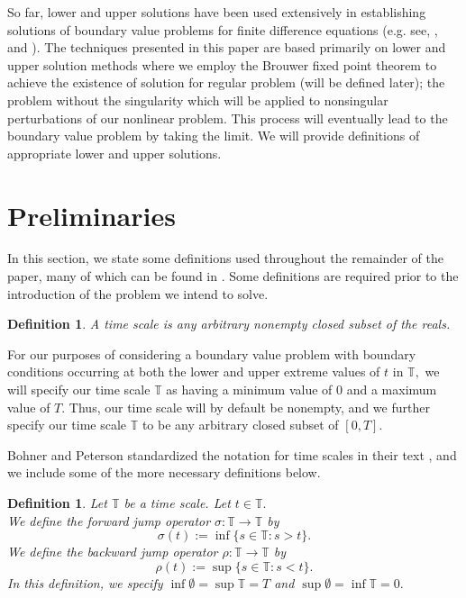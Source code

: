 \documentclass[12pt,reqno]{amsart}
\newtheorem{definition}[theorem]{Definition}
\begin{document}
So far, lower and upper solutions have been used extensively in establishing solutions of boundary value problems for finite difference equations (e.g. see\cite{bao2012}, \cite{henderson2006}, and \cite{precup2016}). The techniques presented in this paper are based primarily on lower and upper solution methods where we employ the Brouwer fixed point theorem \cite{zeidler1986} to achieve the existence of solution for regular problem (will be defined later); the problem without the singularity which will be applied to nonsingular perturbations of our nonlinear problem. This process will eventually lead to the boundary value problem by taking the limit. We will provide definitions of appropriate lower and upper solutions.








\section{Preliminaries}

In this section, we state some definitions used throughout the remainder of the paper, many of which can be found in \cite{bohner2001}.  Some definitions are required prior to the introduction of the problem we intend to solve.

\begin{definition}\label{timescale}
	A time scale is any arbitrary nonempty closed subset of the reals.
\end{definition}

For our purposes of considering a boundary value problem with boundary conditions occurring at both the lower and upper extreme values of $t$ in $\mathbb{T},$ we will specify our time scale $\mathbb{T}$ as having a minimum value of $0$ and a maximum value of $T.$  Thus, our time scale will by default be nonempty, and we further specify our time scale $\mathbb{T}$ to be any arbitrary closed subset of $[0,T].$

Bohner and Peterson standardized the notation for time scales in their text \cite{bohner2001}, and we include some of the more necessary definitions below.

\begin{definition}
	Let $\mathbb{T}$ be a time scale.  Let $t \in \mathbb{T}.$ \\
	We define the forward jump operator $\sigma : \mathbb{T} \rightarrow \mathbb{T}$ by $$\sigma(t) := \inf\{s \in \mathbb{T} : s > t\}.$$
    We define the backward jump operator $\rho : \mathbb{T} \rightarrow \mathbb{T}$ by $$\rho(t) := \sup\{s \in \mathbb{T} : s < t\}.$$
    In this definition, we specify $\inf \emptyset = \sup \mathbb{T} = T$ and $\sup \emptyset = \inf \mathbb{T} = 0.$
\end{definition}
\end{document}
